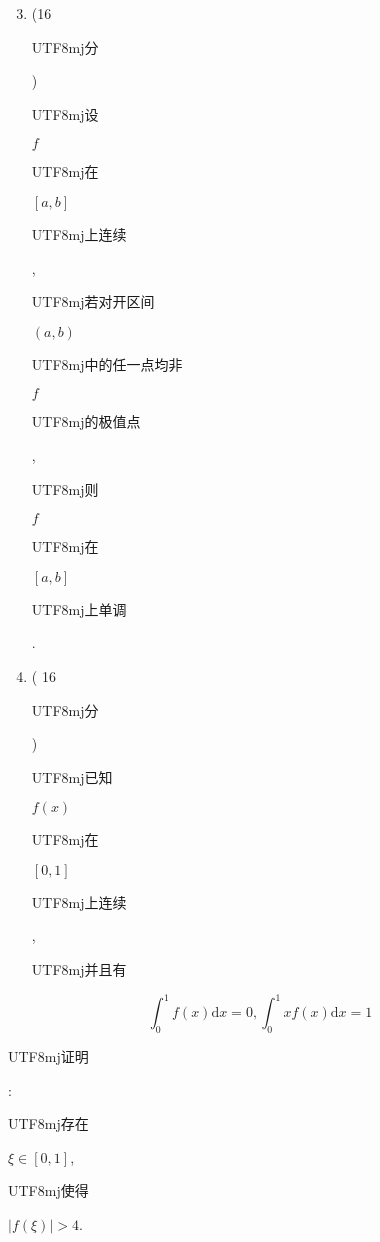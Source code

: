 \documentclass[10pt]{article}
\begin{document}
\begin{enumerate}
  \setcounter{enumi}{2}
  \item (16 \begin{CJK}{UTF8}{mj}分\end{CJK}) \begin{CJK}{UTF8}{mj}设\end{CJK} $f$ \begin{CJK}{UTF8}{mj}在\end{CJK} $[a, b]$ \begin{CJK}{UTF8}{mj}上连续\end{CJK}, \begin{CJK}{UTF8}{mj}若对开区间\end{CJK} $(a, b)$ \begin{CJK}{UTF8}{mj}中的任一点均非\end{CJK} $f$ \begin{CJK}{UTF8}{mj}的极值点\end{CJK}, \begin{CJK}{UTF8}{mj}则\end{CJK} $f$ \begin{CJK}{UTF8}{mj}在\end{CJK} $[a, b]$ \begin{CJK}{UTF8}{mj}上单调\end{CJK}.

  \item ( 16 \begin{CJK}{UTF8}{mj}分\end{CJK}) \begin{CJK}{UTF8}{mj}已知\end{CJK} $f(x)$ \begin{CJK}{UTF8}{mj}在\end{CJK} $[0,1]$ \begin{CJK}{UTF8}{mj}上连续\end{CJK}, \begin{CJK}{UTF8}{mj}并且有\end{CJK}

\end{enumerate}
$$
\int_{0}^{1} f(x) \mathrm{d} x=0, \int_{0}^{1} x f(x) \mathrm{d} x=1
$$
\begin{CJK}{UTF8}{mj}证明\end{CJK}: \begin{CJK}{UTF8}{mj}存在\end{CJK} $\xi \in[0,1]$, \begin{CJK}{UTF8}{mj}使得\end{CJK} $|f(\xi)|>4$.
\end{document}
